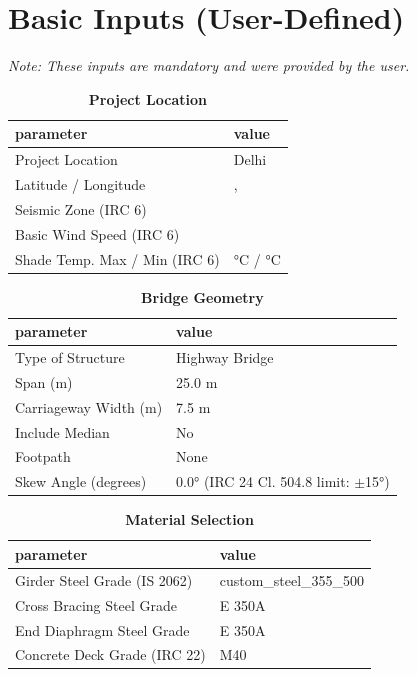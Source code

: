 \documentclass[12pt,a4paper]{report}
\numberwithin{table}{chapter}
\numberwithin{figure}{chapter}
\begin{document}
\section{Basic Inputs (User-Defined)}
\label{sec:basic-inputs}

\noindent\textit{Note: These inputs are mandatory and were provided by the user.}

\begin{table}[H]
\caption{\textbf{Project Location}}
\label{subsec:project-location}
\begin{tabular}{|L{5.5cm}|L{8.5cm}|}
\hline
\textbf{parameter} & \textbf{value} \\
\hline
\textnormal{Project Location} & Delhi \\
\hline
\textnormal{Latitude / Longitude} & ,  \\
\hline
\textnormal{Seismic Zone (IRC 6)} &  \\
\hline
\textnormal{Basic Wind Speed (IRC 6)} &  \\
\hline
\textnormal{Shade Temp. Max / Min (IRC 6)} &  °C /  °C \\
\hline
\end{tabular}
\vspace{0.4cm}
\end{table}

\begin{table}[H]
\caption{\textbf{Bridge Geometry}}
\label{subsec:bridge-geometry}
\begin{tabular}{|L{5.5cm}|L{8.5cm}|}
\hline
\textbf{parameter} & \textbf{value} \\
\hline
\textnormal{Type of Structure} & Highway Bridge \\
\hline
\textnormal{Span (m)} & 25.0 m \\
\hline
\textnormal{Carriageway Width (m)} & 7.5 m \\
\hline
\textnormal{Include Median} & No \\
\hline
\textnormal{Footpath} & None \\
\hline
\textnormal{Skew Angle (degrees)} & 0.0° (IRC 24 Cl. 504.8 limit: $\pm$15°) \\
\hline
\end{tabular}
\end{table}
\vspace{0.4cm}

\begin{table}[H]
\caption{\textbf{Material Selection}}
\label{subsec:material}
\begin{tabular}{|L{5.5cm}|L{8.5cm}|}
\hline
\textbf{parameter} & \textbf{value} \\
\hline
\textnormal{Girder Steel Grade (IS 2062)} & custom\_\allowbreak{}steel\_\allowbreak{}355\_\allowbreak{}500 \\
\hline
\textnormal{Cross Bracing Steel Grade} & E 350A \\
\hline
\textnormal{End Diaphragm Steel Grade} & E 350A \\
\hline
\textnormal{Concrete Deck Grade (IRC 22)} & M40 \\
\hline
\end{tabular}
\end{table}
\vspace{0.4cm}
\end{document}
